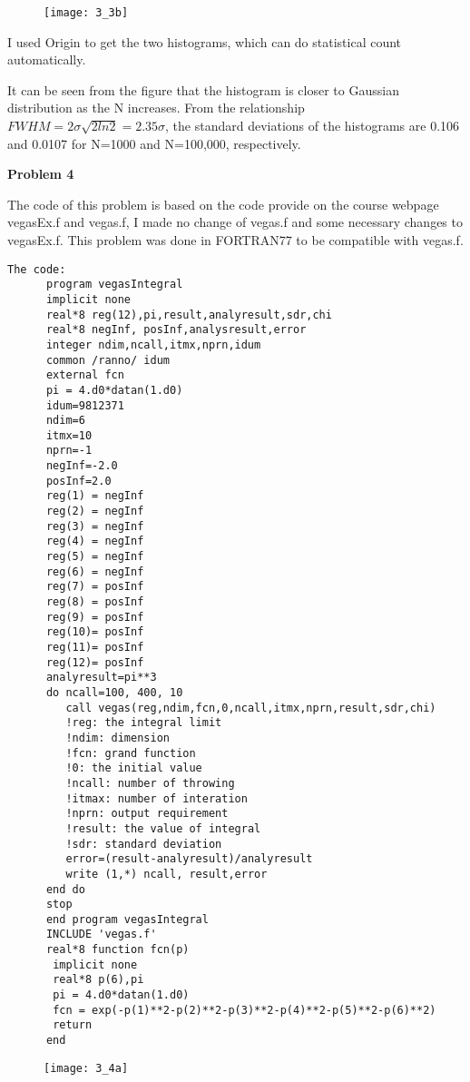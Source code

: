 \documentclass{article}
\begin{document}
\begin{figure} [ht]
\texttt{[image: 3\_3b]}
\end{figure}

I used Origin to get the two histograms, which can do statistical count automatically.


It can be seen from the figure that the histogram is closer to Gaussian distribution as the N increases.  From the relationship $FWHM=2\sigma\sqrt{2ln2}=2.35\sigma$, the standard deviations of the histograms are 0.106 and 0.0107 for N=1000 and N=100,000, respectively.




\vskip 1cm
\textbf{Problem 4}

The code of this problem is based on the code provide on the course webpage vegasEx.f and vegas.f, I made no change of vegas.f and some necessary changes to vegasEx.f.  This problem was done in FORTRAN77 to be compatible with vegas.f.

\begin{verbatim}
The code:
      program vegasIntegral
      implicit none
      real*8 reg(12),pi,result,analyresult,sdr,chi
      real*8 negInf, posInf,analysresult,error
      integer ndim,ncall,itmx,nprn,idum
      common /ranno/ idum
      external fcn
      pi = 4.d0*datan(1.d0)
      idum=9812371
      ndim=6
      itmx=10
      nprn=-1
      negInf=-2.0
      posInf=2.0
      reg(1) = negInf
      reg(2) = negInf
      reg(3) = negInf
      reg(4) = negInf
      reg(5) = negInf
      reg(6) = negInf
      reg(7) = posInf
      reg(8) = posInf
      reg(9) = posInf
      reg(10)= posInf
      reg(11)= posInf
      reg(12)= posInf
      analyresult=pi**3
      do ncall=100, 400, 10
         call vegas(reg,ndim,fcn,0,ncall,itmx,nprn,result,sdr,chi)
         !reg: the integral limit
         !ndim: dimension
         !fcn: grand function
         !0: the initial value
         !ncall: number of throwing
         !itmax: number of interation
         !nprn: output requirement
         !result: the value of integral
         !sdr: standard deviation
         error=(result-analyresult)/analyresult
         write (1,*) ncall, result,error
      end do
      stop
      end program vegasIntegral
      INCLUDE 'vegas.f'
      real*8 function fcn(p)
       implicit none
       real*8 p(6),pi
       pi = 4.d0*datan(1.d0)
       fcn = exp(-p(1)**2-p(2)**2-p(3)**2-p(4)**2-p(5)**2-p(6)**2)
       return
      end
\end{verbatim}

\begin{figure} [ht]
\texttt{[image: 3\_4a]}
\end{figure}
\end{document}
